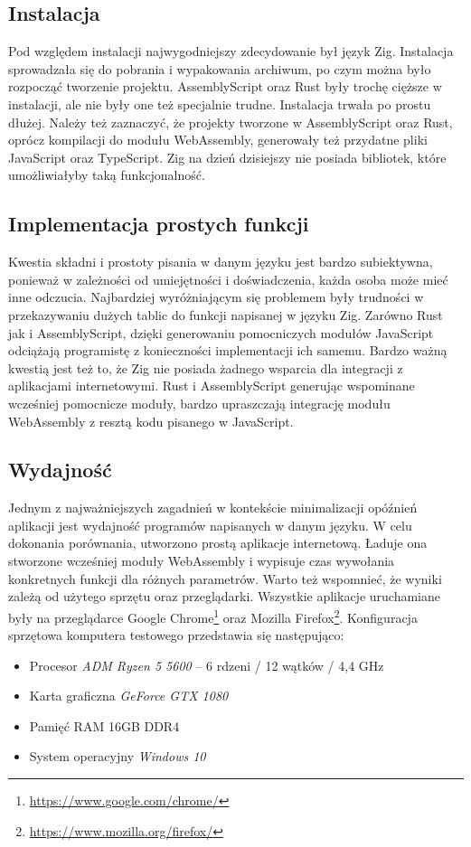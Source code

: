 \documentclass[language=polish,type=master]{aghmodern}
\begin{document}
\subsection{Instalacja}
Pod względem instalacji najwygodniejszy zdecydowanie był język Zig.
Instalacja sprowadzała się do pobrania i wypakowania archiwum, po czym można było rozpocząć tworzenie projektu.
AssemblyScript oraz Rust były trochę cięższe w instalacji, ale nie były one też specjalnie trudne.
Instalacja trwała po prostu dłużej.
Należy też zaznaczyć, że projekty tworzone w AssemblyScript oraz Rust, oprócz kompilacji do modułu WebAssembly, generowały też przydatne pliki JavaScript oraz TypeScript.
Zig na dzień dzisiejszy nie posiada bibliotek, które umożliwiałyby taką funkcjonalność.

\subsection{Implementacja prostych funkcji}
Kwestia składni i prostoty pisania w danym języku jest bardzo subiektywna, ponieważ w zależności od umiejętności i doświadczenia, każda osoba może mieć inne odczucia.
Najbardziej wyróżniającym się problemem były trudności w przekazywaniu dużych tablic do funkcji napisanej w języku Zig.
Zarówno Rust jak i AssemblyScript, dzięki generowaniu pomocniczych modułów JavaScript odciążają programistę z konieczności implementacji ich samemu.
Bardzo ważną kwestią jest też to, że Zig nie posiada żadnego wsparcia dla integracji z aplikacjami internetowymi.
Rust i AssemblyScript generując wspominane wcześniej pomocnicze moduły, bardzo upraszczają integrację modułu WebAssembly z resztą kodu pisanego w JavaScript.

\subsection{Wydajność}
Jednym z najważniejszych zagadnień w kontekście minimalizacji opóźnień aplikacji jest wydajność programów napisanych w danym języku.
W celu dokonania porównania, utworzono prostą aplikacje internetową.
Ładuje ona stworzone wcześniej moduły WebAssembly i wypisuje czas wywołania konkretnych funkcji dla różnych parametrów.
Warto też wspomnieć, że wyniki zależą od użytego sprzętu oraz przeglądarki.
Wszystkie aplikacje uruchamiane były na przeglądarce Google Chrome\footnote{\url{https://www.google.com/chrome/}} oraz Mozilla Firefox\footnote{\url{https://www.mozilla.org/firefox/}}.
Konfiguracja sprzętowa komputera testowego przedstawia się następująco:
\begin{itemize}
    \itemsep0em
    \item Procesor \emph{ADM Ryzen 5 5600} -- 6 rdzeni / 12 wątków / 4,4 GHz
    \item Karta graficzna \emph{GeForce GTX 1080}
    \item Pamięć RAM 16GB DDR4
    \item System operacyjny \emph{Windows 10}
\end{itemize}
\end{document}
